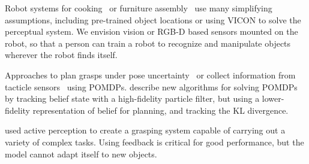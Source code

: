 \documentclass[graybox]{svmult}
\begin{document}
Robot systems for cooking~\citep{bollini12, beetz11} or furniture
assembly~\citep{knepper13} use many simplifying assumptions, including
pre-trained object locations or using VICON to solve the perceptual
system.  We envision vision or RGB-D based sensors mounted on the
robot, so that a person can train a robot to recognize and manipulate
objects wherever the robot finds itself.

Approaches to plan grasps under pose uncertainty~\citep{stulp11} or
collect information from tacticle sensors~\citep{hsiao10} using
POMDPs.  \citet{plat11} describe new algorithms for solving POMDPs by
tracking belief state with a high-fidelity particle filter, but using
a lower-fidelity representation of belief for planning, and tracking
the KL divergence.

\citet{hudson12} used active perception to create a grasping system
capable of carrying out a variety of complex tasks.  Using feedback is
critical for good performance, but the model cannot adapt itself to
new objects.




\citet{tellex11}




\end{document}

